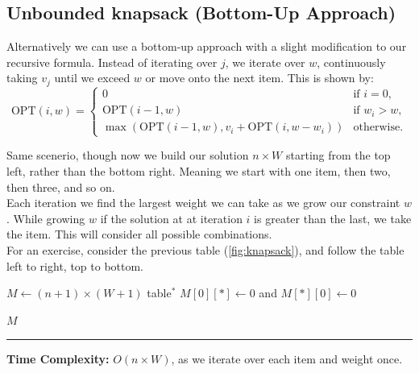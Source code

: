 \subsection*{Unbounded knapsack (Bottom-Up Approach)}
\noindent
Alternatively we can use a bottom-up approach with a slight modification to our recursive formula. Instead of iterating over $j$, we iterate over $w$, 
continuously taking $v_j$ until we exceed $w$ or move onto the next item. This is shown by:
\[
\text{OPT}(i, w) = 
\begin{cases} 
    0 & \text{if } i = 0, \\
    \text{OPT}(i-1, w) & \text{if } w_i > w, \\
    \max\left(\text{OPT}(i-1, w), v_i + \text{OPT}(i, w - w_i)\right) & \text{otherwise.}
\end{cases}
\]

\noindent
Same scenerio, though now we build our solution $n\times W$ starting from the top left, rather than the bottom right. 
Meaning we start with one item, then two, then three, and so on.\\

\noindent
Each iteration we find the largest weight we can take as we grow our constraint $w$. While growing $w$ if the solution at 
at iteration $i$ is greater than the last, we take the item. This will consider all possible combinations.\\

\noindent
For an exercise, consider the previous table (\ref{fig:knapsack}), and follow the table left to right, top to bottom.

\newpage
\begin{Func}

    \vspace{-.5em}
    \begin{algorithm}[H]
        $M \gets (n+1) \times (W+1)$ table$^*$ 
        $M[0][*] \gets 0$ and $M[*][0] \gets 0$ 
        
        \Return $M$\;
    \end{algorithm}
    
    \noindent
    \rule{\textwidth}{0.4pt}
    \textbf{Time Complexity:} $O(n \times W)$, as we iterate over each item and weight once.
\end{Func}












